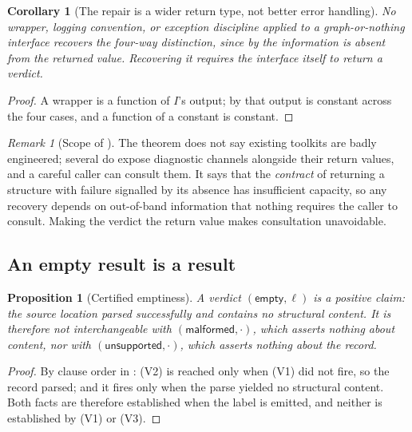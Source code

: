 \documentclass[11pt,twocolumn,a4paper]{article}
\theoremstyle{msthm}
\newtheorem{proposition}[theorem]{Proposition}
\newtheorem{corollary}[theorem]{Corollary}
\theoremstyle{definition}
\theoremstyle{remark}
\newtheorem{remark}[theorem]{Remark}
\begin{document}
\begin{corollary}[The repair is a wider return type, not better error
handling]
\label{cor:wider}
No wrapper, logging convention, or exception discipline applied to a
graph-or-nothing interface recovers the four-way distinction, since by
 the information is absent from the returned value.
Recovering it requires the interface itself to return a verdict.
\end{corollary}

\begin{proof}
A wrapper is a function of $I$'s output; by  that
output is constant across the four cases, and a function of a constant
is constant.
\end{proof}

\begin{remark}[Scope of ]
\label{rem:conflation-scope}
The theorem does not say existing toolkits are badly engineered; several
do expose diagnostic channels alongside their return values, and a
careful caller can consult them. It says that the \emph{contract} of
returning a structure with failure signalled by its absence has
insufficient capacity, so any recovery depends on out-of-band
information that nothing requires the caller to consult. Making the
verdict the return value makes consultation unavoidable.
\end{remark}

\subsection{An empty result is a result}

\begin{proposition}[Certified emptiness]
\label{prop:certified-empty}
A verdict $(\textsf{empty},\ell)$ is a positive claim: the source
location parsed successfully and contains no structural content. It is
therefore not interchangeable with $(\textsf{malformed},\cdot)$, which
asserts nothing about content, nor with
$(\textsf{unsupported},\cdot)$, which asserts nothing about the record.
\end{proposition}

\begin{proof}
By clause order in : (V2) is reached only when (V1) did
not fire, so the record parsed; and it fires only when the parse yielded
no structural content. Both facts are therefore established when the
label is emitted, and neither is established by (V1) or (V3).
\end{proof}
\end{document}
